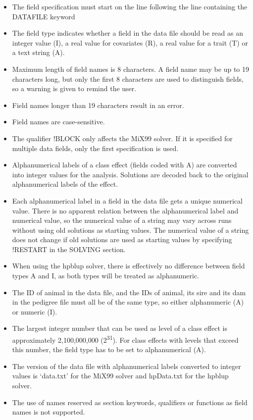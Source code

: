 \begin{itemize}
\item
  The field specification must start on the line following the line
  containing the DATAFILE keyword
\item
  The field type indicates whether a field in the data file should be
  read as an integer value (I), a real value for covariates (R), a real
  value for a trait (T) or a text string (A).
\item
  Maximum length of field names is 8 characters. A field name may be up
  to 19 characters long, but only the first 8 characters are used to
  distinguish fields, so a warning is given to remind the user.
\item
  Field names longer than 19 characters result in an error.
\item
  Field names are case-sensitive.
\item
  The qualifier !BLOCK only affects the MiX99 solver. If it is specified
  for multiple data fields, only the first specification is used.
\item
  Alphanumerical labels of a class effect (fields coded with A) are
  converted into integer values for the analysis. Solutions are decoded
  back to the original alphanumerical labels of the effect.
\item
  Each alphanumerical label in a field in the data file gets a unique
  numerical value. There is no apparent relation between the
  alphanumerical label and numerical value, so the numerical value of a
  string may vary across runs without using old solutions as starting
  values. The numerical value of a string does not change if old
  solutions are used as starting values by specifying !RESTART in the
  SOLVING section.
\item
  When using the hpblup solver, there is effectively no difference
  between field types A and I, as both types will be treated as
  alphanumeric.
\item
  The ID of animal in the data file, and the IDs of animal, its sire and
  its dam in the pedigree file must all be of the same type, so either
  alphanumeric (A) or numeric (I).
\item
  The largest integer number that can be used as level of a class effect
  is approximately 2,100,000,000 (2\textsuperscript{31}). For class
  effects with levels that exceed this number, the field type has to be
  set to alphanumerical (A).
\item
  The version of the data file with alphanumerical labels converted to
  integer values is `data.txt' for the MiX99 solver and hpData.txt for
  the hpblup solver.
\item
  The use of names reserved as section keywords, qualifiers or functions
  as field names is not supported.
\end{itemize}

